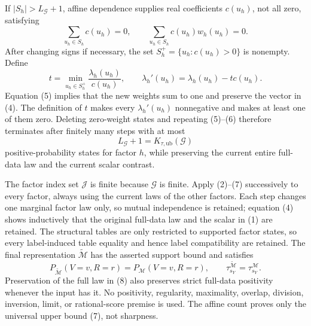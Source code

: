 If \(|S_h|>L_{\mathcal G}+1\), affine dependence supplies real coefficients \(c(u_h)\), not all zero, satisfying
\[
\sum_{u_h\in S_h}c(u_h)=0,
\qquad
\sum_{u_h\in S_h}c(u_h)w_h(u_h)=0.
\tag{5}
\]
After changing signs if necessary, the set \(S_h^+=\{u_h:c(u_h)>0\}\) is nonempty. Define
\[
t=\min_{u_h\in S_h^+}\frac{\lambda_h(u_h)}{c(u_h)},
\qquad
\lambda_h'(u_h)=\lambda_h(u_h)-t c(u_h).
\tag{6}
\]
Equation (5) implies that the new weights sum to one and preserve the vector in (4). The definition of \(t\) makes every \(\lambda_h'(u_h)\) nonnegative and makes at least one of them zero. Deleting zero-weight states and repeating (5)--(6) therefore terminates after finitely many steps with at most
\[
L_{\mathcal G}+1=K_{\tau,\mathrm{ub}}(\mathcal G)
\tag{7}
\]
positive-probability states for factor \(h\), while preserving the current entire full-data law and the current scalar contrast.

The factor index set \(\mathcal J\) is finite because \(\mathcal G\) is finite. Apply (2)--(7) successively to every factor, always using the current laws of the other factors. Each step changes one marginal factor law only, so mutual independence is retained; equation (4) shows inductively that the original full-data law and the scalar in (1) are retained. The structural tables are only restricted to supported factor states, so every label-induced table equality and hence label compatibility are retained. The final representation \(\widetilde{\mathcal M}\) has the asserted support bound and satisfies
\[
P_{\widetilde{\mathcal M}}(V=v,R=r)=P_{\mathcal M}(V=v,R=r),
\qquad
\tau_{s_Y}^{\widetilde{\mathcal M}}=\tau_{s_Y}^{\mathcal M}.
\tag{8}
\]
Preservation of the full law in (8) also preserves strict full-data positivity whenever the input has it. No positivity, regularity, maximality, overlap, division, inversion, limit, or rational-score premise is used. The affine count proves only the universal upper bound (7), not sharpness.